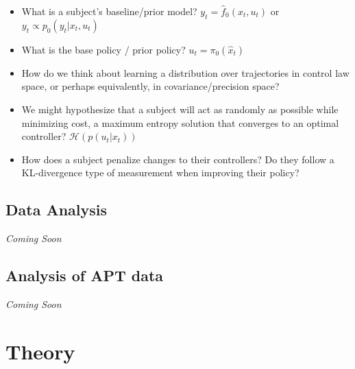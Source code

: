 {\begin{itemize}
              \begin{itemize}
              \tightlist
              \item
                what exploration strategy does a subject use to avoid
                mismatch?
              \item
                what
              \end{itemize}
            \item
              What is a subject's baseline/prior model?
              \(y_{t} = \hat{f}_0(x_t,u_t)\) or
              \(y_{t} \propto p_0(y_t|x_{t},u_t)\)
            \item
              What is the base policy / prior policy?
              \(u_t = \pi_0(\hat{x}_t)\)
            \item
              How do we think about learning a distribution over
              trajectories in control law space, or perhaps
              equivalently, in covariance/precision space?
            \item
              We might hypothesize that a subject will act as randomly
              as possible while minimizing cost, a maximum entropy
              solution that converges to an optimal controller?
              \(\mathcal{H}(p(u_t|x_t))\)
            \item
              How does a subject penalize changes to their controllers?
              Do they follow a KL-divergence type of measurement when
              improving their policy?
            \end{itemize}

            \hypertarget{data-analysis}{%
            \subsection{Data Analysis}\label{data-analysis}}

            \emph{Coming Soon}

            \hypertarget{analysis-of-apt-data}{%
            \subsection{Analysis of APT
            data}\label{analysis-of-apt-data}}

            \emph{Coming Soon}

            \hypertarget{theory}{%
            \section{Theory}\label{theory}}

}
